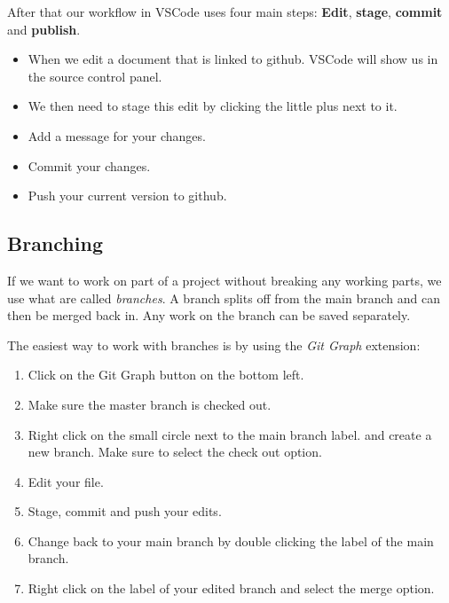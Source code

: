 \documentclass[11pt,a4paper]{report}
\begin{document}
\newpage

After that our workflow in VSCode uses four main steps: {\bf Edit}, {\bf stage}, {\bf commit} and {\bf publish}.
\begin{itemize}
\item When we edit a document that is linked to github. VSCode will show us in the source control panel.
\item We then need to stage this edit by clicking the little plus next to it.
\item Add a message for your changes.
\newpage
\item Commit your changes.
\item Push your current version to github.
\end{itemize}

\subsection{Branching}

If we want to work on part of a project without breaking any working parts, we use what are called \emph{branches}. A branch splits off from the main branch and can then be merged back in. Any work on the branch can be saved separately.

\newpage

The easiest way to work with branches is by using the \emph{Git Graph} extension:
\begin{enumerate}
\item Click on the Git Graph button on the bottom left.
\item Make sure the master branch is checked out.
\item Right click on the small circle next to the main branch label. and create a new branch. 
Make sure to select the check out option.
\item Edit your file.
\item Stage, commit and push your edits.
\item Change back to your main branch by double clicking the label of the main branch.
\item Right click on the label of your edited branch and select the merge option.
\end{enumerate}
\end{document}
